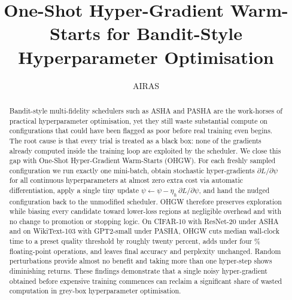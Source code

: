 \documentclass{article}
\title{One-Shot Hyper-Gradient Warm-Starts for Bandit-Style Hyperparameter Optimisation}
\author{AIRAS}
\begin{document}
\maketitle

\begin{abstract}
Bandit-style multi-fidelity schedulers such as ASHA and PASHA are the work-horses of practical hyperparameter optimisation, yet they still waste substantial compute on configurations that could have been flagged as poor before real training even begins. The root cause is that every trial is treated as a black box: none of the gradients already computed inside the training loop are exploited by the scheduler. We close this gap with One-Shot Hyper-Gradient Warm-Starts (OHGW). For each freshly sampled configuration we run exactly one mini-batch, obtain stochastic hyper-gradients \(\partial L / \partial \psi\) for all continuous hyperparameters at almost zero extra cost via automatic differentiation, apply a single tiny update \(\psi \leftarrow \psi - \eta_h\, \partial L / \partial \psi\), and hand the nudged configuration back to the unmodified scheduler. OHGW therefore preserves exploration while biasing every candidate toward lower-loss regions at negligible overhead and with no change to promotion or stopping logic. On CIFAR-10 with ResNet-20 under ASHA and on WikiText-103 with GPT2-small under PASHA, OHGW cuts median wall-clock time to a preset quality threshold by roughly twenty percent, adds under four \% floating-point operations, and leaves final accuracy and perplexity unchanged. Random perturbations provide almost no benefit and taking more than one hyper-step shows diminishing returns. These findings demonstrate that a single noisy hyper-gradient obtained before expensive training commences can reclaim a significant share of wasted computation in grey-box hyperparameter optimisation.
\end{abstract}
\end{document}
